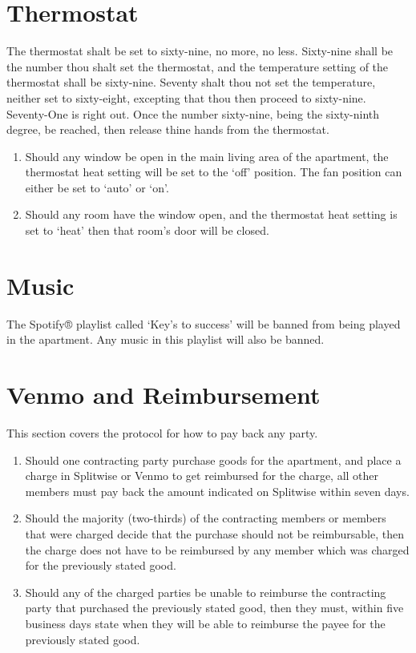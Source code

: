 \documentclass[10pt]{article}
\begin{document}
\section{Thermostat}
The thermostat shalt be set to sixty-nine, no more, no less. Sixty-nine shall be the number thou shalt set the thermostat, and the temperature setting of the thermostat shall be sixty-nine. Seventy shalt thou not set the temperature, neither set to sixty-eight, excepting that thou then proceed to sixty-nine. Seventy-One is right out. Once the number sixty-nine, being the sixty-ninth degree, be reached, then release thine hands from the thermostat.
\begin{enumerate}
	\item Should any window be open in the main living area of the apartment, the thermostat heat setting will be set to the ‘off’ position. The fan position can either be set to ‘auto’ or ‘on’.
	\item Should any room have the window open, and the thermostat heat setting is set to ‘heat’ then that room’s door will be closed.
	
\end{enumerate}

\section{Music}
The Spotify® playlist called ‘Key’s to success’ will be banned from being played in the apartment. Any music in this playlist will also be banned.
\section{Venmo and Reimbursement}
This section covers the protocol for how to pay back any party.
\begin{enumerate}
	\item Should one contracting party purchase goods for the apartment, and place a charge in Splitwise or Venmo to get reimbursed for the charge, all other members must pay back the amount indicated on Splitwise within seven days.
	\item Should the majority (two-thirds) of the contracting members or members that were charged decide that the purchase should not be reimbursable, then the charge does not have to be reimbursed by any member which was charged for the previously stated good.
	\item Should any of the charged parties be unable to reimburse the contracting party that purchased the previously stated good, then they must, within five business days state when they will be able to reimburse the payee for the previously stated good.
	
\end{enumerate}
\end{document}
